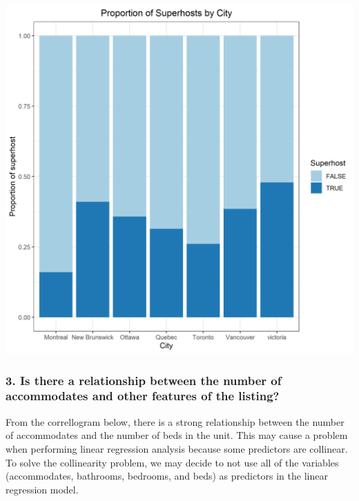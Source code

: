 \documentclass[
]{article}
\begin{document}
\includegraphics{../Images/Proportion_of_superhosts.png}

\hypertarget{is-there-a-relationship-between-the-number-of-accommodates-and-other-features-of-the-listing}{%
\subsubsection{3. Is there a relationship between the number of
accommodates and other features of the
listing?}\label{is-there-a-relationship-between-the-number-of-accommodates-and-other-features-of-the-listing}}

From the correllogram below, there is a strong relationship between the
number of accommodates and the number of beds in the unit. This may
cause a problem when performing linear regression analysis because some
predictors are collinear. To solve the collinearity problem, we may
decide to not use all of the variables (accommodates, bathrooms,
bedrooms, and beds) as predictors in the linear regression model.
\end{document}

